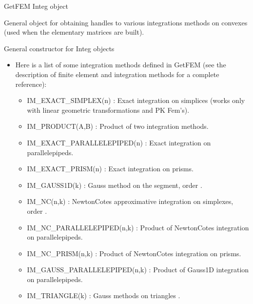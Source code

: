 \documentclass[a4paper,11pt,english]{sphinxmanual}
\begin{document}
\begin{fulllineitems}
\label{\detokenize{python/cmdref_Integ:getfem.Integ}}
GetFEM Integ object

General object for obtaining handles to various integrations methods on
convexes (used when the elementary matrices are built).

General constructor for Integ objects
\begin{itemize}
\item {} 
Here is a list of some integration methods defined in GetFEM (see the
description of finite element and integration methods for a complete
reference):
\begin{itemize}
\item {} 
IM\_EXACT\_SIMPLEX(n) :
Exact integration on simplices (works only with linear geometric
transformations and PK Fem’s).

\item {} 
IM\_PRODUCT(A,B) :
Product of two integration methods.

\item {} 
IM\_EXACT\_PARALLELEPIPED(n) :
Exact integration on parallelepipeds.

\item {} 
IM\_EXACT\_PRISM(n) :
Exact integration on prisms.

\item {} 
IM\_GAUSS1D(k) :
Gauss method on the segment, order .

\item {} 
IM\_NC(n,k) :
Newton\sphinxhyphen{}Cotes approximative integration on simplexes, order .

\item {} 
IM\_NC\_PARALLELEPIPED(n,k) :
Product of Newton\sphinxhyphen{}Cotes integration on parallelepipeds.

\item {} 
IM\_NC\_PRISM(n,k) :
Product of Newton\sphinxhyphen{}Cotes integration on prisms.

\item {} 
IM\_GAUSS\_PARALLELEPIPED(n,k) :
Product of Gauss1D integration on parallelepipeds.

\item {} 
IM\_TRIANGLE(k) :
Gauss methods on triangles .


\end{itemize}
\end{itemize}
\end{fulllineitems}
\end{document}

